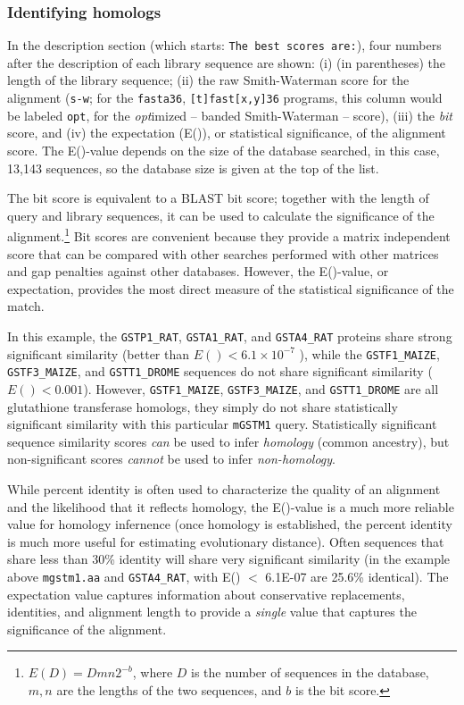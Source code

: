 \documentclass[11pt]{article}
\begin{document}
\subsubsection{Identifying homologs}
In the description section (which starts: \texttt{The best scores
  are:}), four numbers after the description of each library sequence
are shown: (i) (in parentheses) the length of the library sequence;
(ii) the raw Smith-Waterman score for the alignment (\texttt{s-w}; for
the \texttt{fasta36}, \texttt{[t]fast[x,y]36} programs, this column
would be labeled \texttt{opt}, for the \emph{opt}imized -- banded
Smith-Waterman -- score), (iii) the \emph{bit} score, and (iv) the
expectation (E()), or statistical significance, of the alignment
score.  The E()-value depends on the size of the database searched, in
this case, 13,143 sequences, so the database size is given at the top
of the list.

The bit score is equivalent to a BLAST bit score; together with the
length of query and library sequences, it can be used to calculate the
significance of the alignment.\footnote{$E(D) = D m n 2^{-b}$,
where $D$ is the number of sequences in the database, $m, n$ are the
lengths of the two sequences, and $b$ is the bit score.}  Bit scores
are convenient because they provide a matrix independent score that
can be compared with other searches performed with other matrices and
gap penalties against other databases.  However, the E()-value, or
expectation, provides the most direct measure of the statistical
significance of the match.

In this example, the \texttt{GSTP1\_RAT}, \texttt{GSTA1\_RAT}, and
\texttt{GSTA4\_RAT} proteins share strong significant similarity
(better than $E() < 6.1 \times 10^{-7}$ ), while the
\texttt{GSTF1\_MAIZE}, \texttt{GSTF3\_MAIZE}, and
\texttt{GSTT1\_DROME} sequences do not share significant similarity
($E() < 0.001$).  However, \texttt{GSTF1\_MAIZE},
\texttt{GSTF3\_MAIZE}, and \texttt{GSTT1\_DROME} are all glutathione
transferase homologs, they simply do not share statistically
significant similarity with this particular \texttt{mGSTM1} query.
Statistically significant sequence similarity scores \emph{can} be
used to infer \emph{homology} (common ancestry), but non-significant
scores \emph{cannot} be used to infer \emph{non-homology}.

While percent identity is often used to characterize the quality of an
alignment and the likelihood that it reflects homology, the E()-value
is a much more reliable value for homology infernence (once homology is
established, the percent identity is much more useful for estimating
evolutionary distance).  Often sequences that share less than 30\%
identity will share very significant similarity (in the example above
\texttt{mgstm1.aa} and \texttt{GSTA4\_RAT}, with E() $<$ 6.1E-07 are
25.6\% identical).  The expectation value captures information about
conservative replacements, identities, and alignment length to provide
a \emph{single} value that captures the significance of the alignment.
\end{document}
